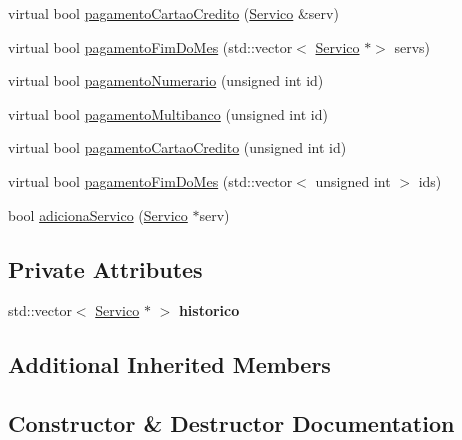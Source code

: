 \begin{DoxyCompactItemize}
\item 
virtual bool \hyperlink{class_registado_a1d6da4b2cbc8340fa79055a026d4ea44}{pagamento\+Cartao\+Credito} (\hyperlink{class_servico}{Servico} \&serv)
\item 
virtual bool \hyperlink{class_registado_a87218f9b1e1aa767c6c77b71f38cca55}{pagamento\+Fim\+Do\+Mes} (std\+::vector$<$ \hyperlink{class_servico}{Servico} $\ast$$>$ servs)
\item 
virtual bool \hyperlink{class_registado_a16a6ec63ed53fd4b6ebb1105ae5812d7}{pagamento\+Numerario} (unsigned int id)
\item 
virtual bool \hyperlink{class_registado_a3338ad6a9c5980671f2eb3b48d8798de}{pagamento\+Multibanco} (unsigned int id)
\item 
virtual bool \hyperlink{class_registado_a957b62d73c6ea619fb29e63255e11b12}{pagamento\+Cartao\+Credito} (unsigned int id)
\item 
virtual bool \hyperlink{class_registado_a0ee7364d85601f95bfe6bf45c062ec06}{pagamento\+Fim\+Do\+Mes} (std\+::vector$<$ unsigned int $>$ ids)
\item 
bool \hyperlink{class_registado_acc2088074502804017ff3e40022d966c}{adiciona\+Servico} (\hyperlink{class_servico}{Servico} $\ast$serv)
\end{DoxyCompactItemize}
\subsection*{Private Attributes}
\begin{DoxyCompactItemize}
\item 
\hypertarget{class_registado_ab5a4890cf0db0c42da0caeecb6f9f31f}{}\label{class_registado_ab5a4890cf0db0c42da0caeecb6f9f31f} 
std\+::vector$<$ \hyperlink{class_servico}{Servico} $\ast$ $>$ {\bfseries historico}
\end{DoxyCompactItemize}
\subsection*{Additional Inherited Members}


\subsection{Constructor \& Destructor Documentation}
\hypertarget{class_registado_ace8988ba72da772309e5aebf0bc82d4d}{}\label{class_registado_ace8988ba72da772309e5aebf0bc82d4d} 
